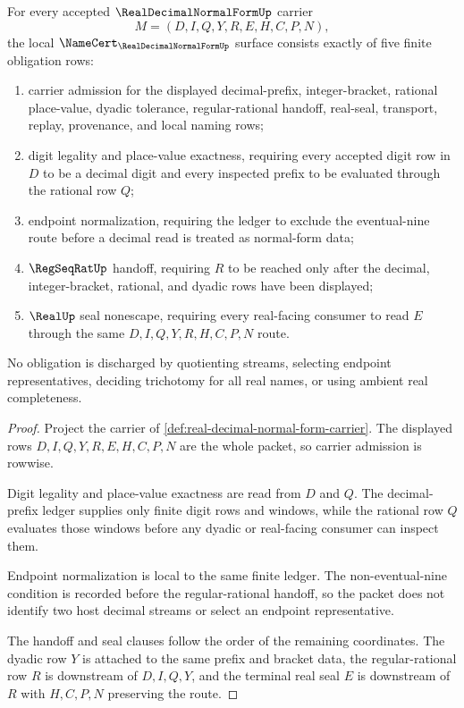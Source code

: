 \begin{theorem}
\label{thm:real-decimal-normal-form-namecert-obligations}
For every accepted $\RealDecimalNormalFormUp$ carrier
$$
M=(D,I,Q,Y,R,E,H,C,P,N),
$$
the local $\NameCert_{\RealDecimalNormalFormUp}$ surface consists exactly of
five finite obligation rows:
\begin{enumerate}
\item carrier admission for the displayed decimal-prefix, integer-bracket,
  rational place-value, dyadic tolerance, regular-rational handoff, real-seal,
  transport, replay, provenance, and local naming rows;
\item digit legality and place-value exactness, requiring every accepted
  digit row in $D$ to be a decimal digit and every inspected prefix to be
  evaluated through the rational row $Q$;
\item endpoint normalization, requiring the ledger to exclude the
  eventual-nine route before a decimal read is treated as normal-form data;
\item $\RegSeqRatUp$ handoff, requiring $R$ to be reached only after the
  decimal, integer-bracket, rational, and dyadic rows have been displayed;
\item $\RealUp$ seal nonescape, requiring every real-facing consumer to read
  $E$ through the same $D,I,Q,Y,R,H,C,P,N$ route.
\end{enumerate}
No obligation is discharged by quotienting streams, selecting endpoint
representatives, deciding trichotomy for all real names, or using ambient
real completeness.
\end{theorem}
\begin{proof}
Project the carrier of \autoref{def:real-decimal-normal-form-carrier}. The
displayed rows $D,I,Q,Y,R,E,H,C,P,N$ are the whole packet, so carrier
admission is rowwise.

Digit legality and place-value exactness are read from $D$ and $Q$. The
decimal-prefix ledger supplies only finite digit rows and windows, while the
rational row $Q$ evaluates those windows before any dyadic or real-facing
consumer can inspect them.

Endpoint normalization is local to the same finite ledger. The non-eventual-nine
condition is recorded before the regular-rational handoff, so the packet
does not identify two host decimal streams or select an endpoint
representative.

The handoff and seal clauses follow the order of the remaining coordinates.
The dyadic row $Y$ is attached to the same prefix and bracket data, the
regular-rational row $R$ is downstream of $D,I,Q,Y$, and the terminal real
seal $E$ is downstream of $R$ with $H,C,P,N$ preserving the route.
\end{proof}

